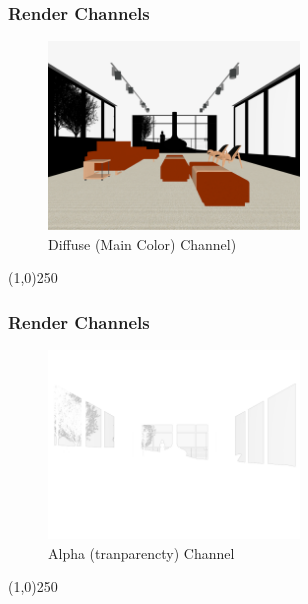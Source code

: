 \begin{frame}
\frametitle{Render Channels}
\begin{figure}
	\centering
	\includegraphics[height=5cm]{./img/Rendering/SittingRoomFinalDiffuse.png}
	\caption[Diffuse (Main Color) Channel)]{Diffuse (Main Color) Channel)}
	\label{fig:sittingroomfinalDiffuse}
\end{figure}
\end{frame}
\begin{center}\line(1,0){250}\end{center}



\begin{frame}
\frametitle{Render Channels}
\begin{figure}
	\centering
	\includegraphics[height=5cm]{./img/Rendering/SittingRoomFinalAlpha.png}
	\caption[Alpha (tranparencty) Channel]{Alpha (tranparencty) Channel}
	\label{fig:sittingroomfinalAlpha}
\end{figure}
\end{frame}
\begin{center}\line(1,0){250}\end{center}






